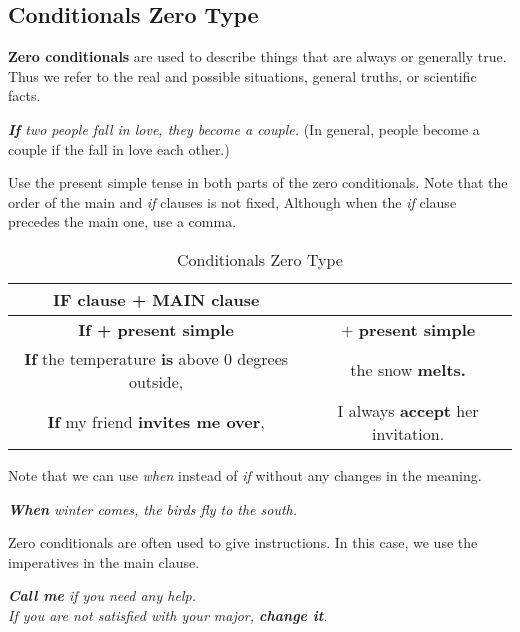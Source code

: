 \documentclass[hidelinks,10pt,a4paper]{article}
\begin{document}
\subsection{Conditionals Zero Type}
\textbf{Zero conditionals} are used to describe things that are always or generally true. Thus we refer to the real and possible situations, general truths, or scientific facts.

\begin{center}
	\textit{\textbf{If} two people fall in love, they become a couple.} (In general, people become a couple if the fall in love each other.)
\end{center}

Use the present simple tense in both parts of the zero conditionals. Note that the order of the main and \textit{if} clauses is not fixed, Although when the \textit{if} clause precedes the main one, use a comma.

\begin{table}[h]
\begin{center}
\begin{tabular}{|c|c|}
	\hline
	\textbf{IF clause} + \textbf{MAIN clause} \\ \hline
	\textbf{If + present simple} & + \textbf{present simple} \\ \hline
	\textbf{If} the temperature \textbf{is} above 0 degrees outside, & the snow \textbf{melts.} \\ \hline
	\textbf{If} my friend \textbf{invites me over}, & I always \textbf{accept}   her invitation. \\ \hline
\end{tabular}
\end{center}
\caption{Conditionals Zero Type} \label{tab:czt}
\end{table}

Note that we can use \textit{when} instead of \textit{if} without any changes in the meaning.

\begin{center}
	\textit{\textbf{When} winter comes, the birds fly to the south. }
\end{center}

Zero conditionals are often used to give instructions. In this case, we use the imperatives in the main clause.

\begin{center}
	\textit{\textbf{Call me} if you need any help.}\\
	\textit{If you are not satisfied with your major, \textbf{change it}. }
\end{center}
\end{document}
